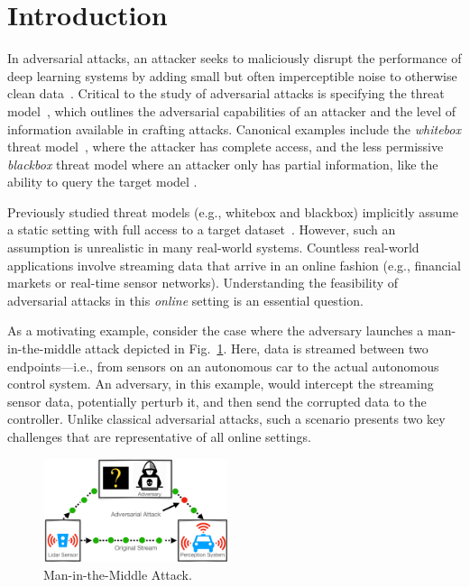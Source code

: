 \section{Introduction}


In adversarial attacks, an attacker seeks to maliciously disrupt the performance of deep learning systems by adding small but often imperceptible noise to otherwise clean data~\citep{szegedy2013intriguing,goodfellow2014explaining}. Critical to the study of adversarial attacks is specifying the threat model~\cite{akhtar2018threat}, which outlines the adversarial capabilities of an attacker and the level of information available in crafting attacks. Canonical examples include the \textit{whitebox} threat model~\cite{madry2017towards}, where the attacker has complete access, and the less permissive \textit{blackbox} threat model where an attacker only has partial information, like the ability to query the target model \citep{chen2017zoo,ilyas2017query,papernot2016transferability}. 

Previously studied threat models (e.g., whitebox and blackbox) implicitly assume a static setting with full access to a target dataset~\citep{tramer2017ensemble}. However, such an assumption is unrealistic in many real-world systems. Countless real-world applications involve streaming data that arrive in an online fashion (e.g., financial markets or real-time sensor networks). Understanding the feasibility of adversarial attacks in this {\em online} setting is an essential question. 

As a motivating example, consider the case where the adversary launches a man-in-the-middle attack depicted in Fig.~\ref{fig:man_in_the_middle}. Here, data is streamed between two endpoints---i.e., from sensors on an autonomous car to the actual autonomous control system. 
An adversary, in this example, would intercept the streaming sensor data, potentially perturb it, and then send the corrupted data to the controller. Unlike classical adversarial attacks, such a scenario presents two key challenges that are representative of all online settings. 

\begin{figure}
    \includegraphics[width=0.48\textwidth]{Figures/man_in_the_middle_attack_2.pdf}
\caption{Man-in-the-Middle Attack.}
\label{fig:man_in_the_middle}
\end{figure}

